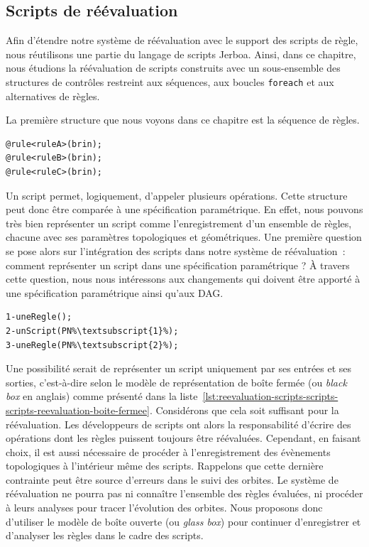 \subsection{Scripts de réévaluation}
\label{sec:extension-scripts-scripts-scripts-reevaluation}

Afin d'étendre notre système de réévaluation avec le support des scripts de
règle, nous réutilisons une partie du langage de scripts Jerboa. %
Ainsi, dans ce chapitre, nous étudions la réévaluation de scripts construits
avec un sous-ensemble des structures de contrôles restreint aux séquences, aux
boucles \texttt{foreach} et aux alternatives de règles. %

La première structure que nous voyons dans ce chapitre est la séquence de
règles. %
\begin{lstlisting}[style=script-style,language=jerboa-script]
@rule<ruleA>(brin);
@rule<ruleB>(brin);
@rule<ruleC>(brin);
\end{lstlisting}
Un script permet, logiquement, d'appeler plusieurs opérations. %
Cette structure peut donc être comparée à une spécification paramétrique. %
En effet, nous pouvons très bien représenter un script comme l'enregistrement
d'un ensemble de règles, chacune avec ses paramètres topologiques et
géométriques. %
Une première question se pose alors sur l'intégration des scripts dans notre
système de réévaluation~: comment représenter un script dans une spécification
paramétrique ? %
À travers cette question, nous nous intéressons aux changements qui doivent être
apporté à une spécification paramétrique ainsi qu'aux DAG. %
\begin{lstlisting}[style=script-style,
escapechar=\%,
caption=Exemple de spécification «~boîte fermée~»,
label=lst:reevaluation-scripts-scripts-scripts-reevaluation-boite-fermee]
1-uneRegle();
2-unScript(PN%\textsubscript{1}%);
3-uneRegle(PN%\textsubscript{2}%);
\end{lstlisting}
Une possibilité serait de représenter un script uniquement par ses entrées et
ses sorties, c'est-à-dire selon le modèle de représentation de boîte fermée (ou
\textit{black box} en anglais) comme présenté dans la
liste~\ref{lst:reevaluation-scripts-scripts-scripts-reevaluation-boite-fermee}. %
Considérons que cela soit suffisant pour la réévaluation. %
Les développeurs de scripts ont alors la responsabilité d'écrire des opérations
dont les règles puissent toujours être réévaluées. %
Cependant, en faisant choix, il est aussi nécessaire de procéder à
l'enregistrement des évènements topologiques à l'intérieur même des scripts. %
Rappelons que cette dernière contrainte peut être source d'erreurs dans le suivi
des orbites. %
Le système de réévaluation ne pourra pas ni connaître l'ensemble des règles
évaluées, ni procéder à leurs analyses pour tracer l'évolution des orbites. %
Nous proposons donc d'utiliser le modèle de boîte ouverte (ou \textit{glass
  box}) pour continuer d'enregistrer et d'analyser les règles dans le cadre des
scripts. %

